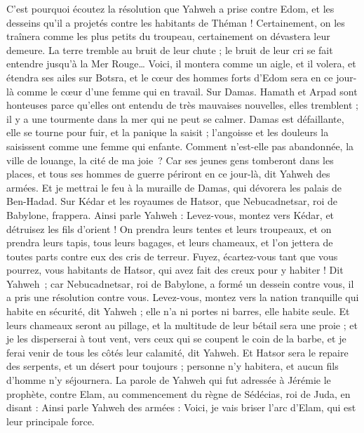 \begin{multicols}{2}
C'est pourquoi écoutez la résolution que Yahweh a prise contre Edom, et les desseins qu'il a projetés contre les habitants de Théman ! Certainement, on les traînera comme les plus petits du troupeau, certainement on dévastera leur demeure.
La terre tremble au bruit de leur chute ; le bruit de leur cri se fait entendre jusqu'à la Mer Rouge…
Voici, il montera comme un aigle, et il volera, et étendra ses ailes sur Botsra, et le cœur des hommes forts d'Edom sera en ce jour-là comme le cœur d'une femme qui en travail.
Sur Damas. Hamath et Arpad sont honteuses parce qu'elles ont entendu de très mauvaises nouvelles, elles tremblent ; il y a une tourmente dans la mer qui ne peut se calmer.
Damas est défaillante, elle se tourne pour fuir, et la panique la saisit ; l'angoisse et les douleurs la saisissent comme une femme qui enfante.
Comment n’est-elle pas abandonnée, la ville de louange, la cité de ma joie ?
Car ses jeunes gens tomberont dans les places, et tous ses hommes de guerre périront en ce jour-là, dit Yahweh des armées.
Et je mettrai le feu à la muraille de Damas, qui dévorera les palais de Ben-Hadad.
Sur Kédar et les royaumes de Hatsor, que Nebucadnetsar, roi de Babylone, frappera. Ainsi parle Yahweh : Levez-vous, montez vers Kédar, et détruisez les fils d'orient !
On prendra leurs tentes et leurs troupeaux, et on prendra leurs tapis, tous leurs bagages, et leurs chameaux, et l'on jettera de toutes parts contre eux des cris de terreur.
Fuyez, écartez-vous tant que vous pourrez, vous habitants de Hatsor, qui avez fait des creux pour y habiter ! Dit Yahweh ; car Nebucadnetsar, roi de Babylone, a formé un dessein contre vous, il a pris une résolution contre vous.
Levez-vous, montez vers la nation tranquille qui habite en sécurité, dit Yahweh ; elle n'a ni portes ni barres, elle habite seule.
Et leurs chameaux seront au pillage, et la multitude de leur bétail sera une proie ; et je les disperserai à tout vent, vers ceux qui se coupent le coin de la barbe, et je ferai venir de tous les côtés leur calamité, dit Yahweh.
Et Hatsor sera le repaire des serpents, et un désert pour toujours ; personne n'y habitera, et aucun fils d'homme n'y séjournera.
La parole de Yahweh qui fut adressée à Jérémie le prophète, contre Elam, au commencement du règne de Sédécias, roi de Juda, en disant :
Ainsi parle Yahweh des armées : Voici, je vais briser l'arc d'Elam, qui est leur principale force.

\end{multicols}
